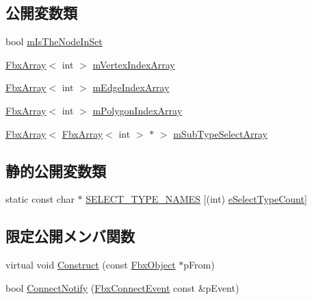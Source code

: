 \subsection*{公開変数類}
\begin{DoxyCompactItemize}
\item 
bool \hyperlink{class_fbx_selection_node_abe086e3632a8526188a5c706f3edff0d}{m\+Is\+The\+Node\+In\+Set}
\item 
\hyperlink{class_fbx_array}{Fbx\+Array}$<$ int $>$ \hyperlink{class_fbx_selection_node_ad58af0a699e64661e138fc9c17cb33c2}{m\+Vertex\+Index\+Array}
\item 
\hyperlink{class_fbx_array}{Fbx\+Array}$<$ int $>$ \hyperlink{class_fbx_selection_node_a08402c700791599a3d025a55d52f725e}{m\+Edge\+Index\+Array}
\item 
\hyperlink{class_fbx_array}{Fbx\+Array}$<$ int $>$ \hyperlink{class_fbx_selection_node_a542b95a44b33e6b88af56e202612583f}{m\+Polygon\+Index\+Array}
\item 
\hyperlink{class_fbx_array}{Fbx\+Array}$<$ \hyperlink{class_fbx_array}{Fbx\+Array}$<$ int $>$ $\ast$ $>$ \hyperlink{class_fbx_selection_node_abb893b8d98420522d6bc2790780b54a3}{m\+Sub\+Type\+Select\+Array}
\end{DoxyCompactItemize}
\subsection*{静的公開変数類}
\begin{DoxyCompactItemize}
\item 
static const char $\ast$ \hyperlink{class_fbx_selection_node_ad7174a58a6d0031ac615900251821fd5}{S\+E\+L\+E\+C\+T\+\_\+\+T\+Y\+P\+E\+\_\+\+N\+A\+M\+ES} \mbox{[}(int) \hyperlink{class_fbx_selection_node_aa24cf47b60ff436a1cce9409da37e78fa6f7e60aadbb76284e3352814a5a4f299}{e\+Select\+Type\+Count}\mbox{]}
\end{DoxyCompactItemize}
\subsection*{限定公開メンバ関数}
\begin{DoxyCompactItemize}
\item 
virtual void \hyperlink{class_fbx_selection_node_aaef80cf95a8109fe5cc6263f18d7cb99}{Construct} (const \hyperlink{class_fbx_object}{Fbx\+Object} $\ast$p\+From)
\item 
bool \hyperlink{class_fbx_selection_node_acf8e30df7df84c4fbff9c12f64a2b3fe}{Connect\+Notify} (\hyperlink{class_fbx_connect_event}{Fbx\+Connect\+Event} const \&p\+Event)
\end{DoxyCompactItemize}
